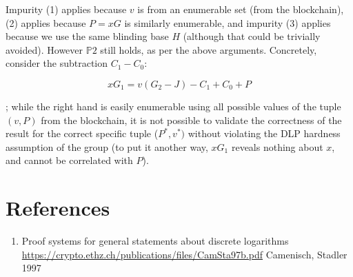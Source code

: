 \documentclass[10pt,a4paper]{article}
\providecommand{\tightlist}{%
  \setlength{\itemsep}{0pt}\setlength{\parskip}{0pt}}
\begin{document}
Impurity (1) applies because $v$ is from an enumerable set (from the blockchain), (2) applies because $P=xG$ is similarly enumerable, and impurity (3) applies because we use the same blinding base $H$ (although that could be trivially avoided). However $\mathbb{P}2$ still holds, as per the above arguments. Concretely, consider the subtraction $C_1 - C_0$:

$$xG_1  = v(G_2 -J) -C_1 + C_0 + P$$

; while the right hand is easily enumerable using all possible values of the tuple $(v, P)$ from the blockchain, it is not possible to validate the correctness of the result for the correct specific tuple ($P^*, v^*)$ without violating the DLP hardness assumption of the group (to put it another way, $xG_1$ reveals nothing about $x$, and cannot be correlated with $P$).




\hypertarget{references}{%
\section[References]{\texorpdfstring{\protect\hypertarget{anchor-77}{}{}References}{References}}\label{references}}

\begin{enumerate}
\def\labelenumi{\arabic{enumi}.}
\tightlist
\item
  \protect\hypertarget{anchor-7}{}{} Proof systems for general statements about discrete logarithms
  \url{https://crypto.ethz.ch/publications/files/CamSta97b.pdf} Camenisch, Stadler 1997
\end{enumerate}
\end{document}
